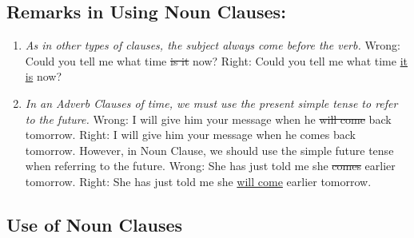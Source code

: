 \subsection{Remarks in Using Noun Clauses:}
\begin{enumerate}
    \item
        {\it
        As in other types of clauses, the subject always come before the verb.
        }
        \newline
        \newline
        Wrong: Could you tell me what time \st{is it} now?
        \newline
        Right: Could you tell me what time \underline{it is} now?
    \item
        {\it
        In an Adverb Clauses of time, we must use the present simple tense to
        refer to the future.
        }
        \newline
        \newline
        Wrong: I will give him your message when he \st{will come} back
        tomorrow.
        \newline
        Right: I will give him your message when he comes back tomorrow.
        \newline
        \newline
        However, in Noun Clause, we should use the simple future tense when
        referring to the future.
        \newline
        Wrong: She has just told me she \st{comes} earlier tomorrow.
        \newline
        Right: She has just told me she \underline{will come} earlier tomorrow.
\end{enumerate}

\subsection{Use of Noun Clauses}


